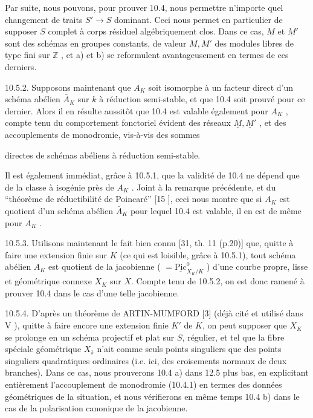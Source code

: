Par suite, nous pouvons, pour prouver 10.4, nous permettre n'importe quel changement de traits $S' \longrightarrow S$ dominant. Ceci nous permet en particulier de supposer $S$ complet à corps résiduel algébriquement clos. Dans ce cas, $\underline{M}$ et $\underline{M}'$ sont des schémas en groupes constants, de valeur $M,M'$ des modules libres de type fini sur $\mathbb{Z}$ , et a) et b) se reformulent avantageusement en termes de ces derniers.

10.5.2. Supposons maintenant que $A_K$ soit isomorphe à un facteur direct d'un schéma abélien $\bar{A}_K$ sur $k$ à réduction semi-stable, et que 10.4 soit prouvé pour ce dernier. Alors il en résulte aussitôt que 10.4 est valable également pour $A_K$ , compte tenu du comportement fonctoriel évident des réseaux $\underline{M},\underline{M}'$ , et des accouplements de monodromie, vis-à-vis des sommes



directes de schémas abéliens à réduction semi-stable.

Il est également immédiat, grâce à 10.5.1, que la validité de 10.4 ne dépend que de la classe à isogénie près de $A_K$ . Joint à la remarque précédente, et du ``théorème de réductibilité de Poincaré'' [15 \qquad ], ceci nous montre que si $A_K$ est quotient d'un schéma abélien $\bar{A}_K$ pour lequel 10.4 est valable, il en est de même pour $A_K$ .

10.5.3. Utilisons maintenant le fait bien connu [31, th. 11 (p.20)] que, quitte à faire une extension finie sur $K$ (ce qui est loisible, grâce à 10.5.1), tout schéma abélien $A_K$ est quotient de la jacobienne ( $= \underline{\mathrm{Pic}}^{0}_{X_K/K}$ ) d'une courbe propre, lisse et géométrique connexe $X_K$ sur $X$. Compte tenu de 10.5.2, on est donc ramené à prouver 10.4 dans le cas d'une telle jacobienne.

10.5.4. D'après un théorème de ARTIN-MUMFORD [3] (déjà cité et utilisé dans V \qquad ), quitte à faire encore une extension finie $K'$ de $K$, on peut supposer que $X_K$ se prolonge en un schéma projectif et plat sur $S$, régulier, et tel que la fibre spéciale géométrique $X_{\bar{s}}$ n'ait comme seuls points singuliers que des points singuliers quadratiques ordinaires (i.e. ici, des croisements normaux de deux branches). Dans ce cas, nous prouverons 10.4 a) dans 12.5 plus bas, en explicitant entièrement l'accouplement de monodromie (10.4.1) en termes des données géométriques de la situation, et nous vérifierons en même temps 10.4 b) dans le cas de la polarisation canonique de la jacobienne.



